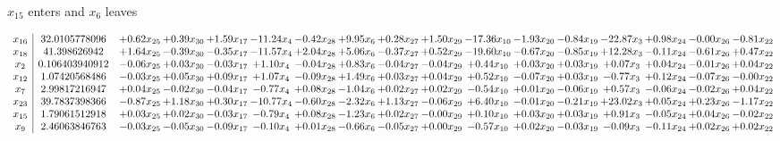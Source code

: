 \documentclass[9pt]{article}
\begin{document}
 $ x_{15} $ enters and $ x_{6} $ leaves 

 \[\begin{array}{c| c c@{\hskip 2pt} c@{\hskip 2pt} c@{\hskip 2pt} c@{\hskip 2pt} c@{\hskip 2pt} c@{\hskip 2pt} c@{\hskip 2pt} c@{\hskip 2pt} c@{\hskip 2pt} c@{\hskip 2pt} c@{\hskip 2pt} c@{\hskip 2pt} c@{\hskip 2pt} c@{\hskip 2pt} c@{\hskip 2pt} }
 x_{16}   &  32.0105778096 & +  0.62 x_{25} & +  0.39 x_{30} & +  1.59 x_{17} & -11.24 x_{4} & -0.42 x_{28} & +  9.95 x_{6} & +  0.28 x_{27} & +  1.50 x_{29} & -17.36 x_{10} & -1.93 x_{20} & -0.84 x_{19} & -22.87 x_{3} & +  0.98 x_{24} & -0.00 x_{26} & -0.81 x_{22}\\
 x_{18}   &  41.398626942 & +  1.64 x_{25} & -0.39 x_{30} & -0.35 x_{17} & -11.57 x_{4} & +  2.04 x_{28} & +  5.06 x_{6} & -0.37 x_{27} & +  0.52 x_{29} & -19.60 x_{10} & -0.67 x_{20} & -0.85 x_{19} & + 12.28 x_{3} & -0.11 x_{24} & -0.61 x_{26} & +  0.47 x_{22}\\
 x_{2}   &  0.106403940912 & -0.06 x_{25} & +  0.03 x_{30} & -0.03 x_{17} & +  1.10 x_{4} & -0.04 x_{28} & +  0.83 x_{6} & -0.04 x_{27} & -0.04 x_{29} & +  0.44 x_{10} & +  0.03 x_{20} & +  0.03 x_{19} & +  0.07 x_{3} & +  0.04 x_{24} & -0.01 x_{26} & +  0.04 x_{22}\\
 x_{12}   &  1.07420568486 & -0.03 x_{25} & +  0.05 x_{30} & +  0.09 x_{17} & +  1.07 x_{4} & -0.09 x_{28} & +  1.49 x_{6} & +  0.03 x_{27} & +  0.04 x_{29} & +  0.52 x_{10} & -0.07 x_{20} & +  0.03 x_{19} & -0.77 x_{3} & +  0.12 x_{24} & -0.07 x_{26} & -0.00 x_{22}\\
 x_{7}   &  2.99817216947 & +  0.04 x_{25} & -0.02 x_{30} & -0.04 x_{17} & -0.77 x_{4} & +  0.08 x_{28} & -1.04 x_{6} & +  0.02 x_{27} & +  0.02 x_{29} & -0.54 x_{10} & +  0.01 x_{20} & -0.06 x_{19} & +  0.57 x_{3} & -0.06 x_{24} & -0.02 x_{26} & +  0.04 x_{22}\\
 x_{23}   &  39.7837398366 & -0.87 x_{25} & +  1.18 x_{30} & +  0.30 x_{17} & -10.77 x_{4} & -0.60 x_{28} & -2.32 x_{6} & +  1.13 x_{27} & -0.06 x_{29} & +  6.40 x_{10} & -0.01 x_{20} & -0.21 x_{19} & + 23.02 x_{3} & +  0.05 x_{24} & +  0.23 x_{26} & -1.17 x_{22}\\
 x_{15}   &  1.79061512918 & +  0.03 x_{25} & +  0.02 x_{30} & -0.03 x_{17} & -0.79 x_{4} & +  0.08 x_{28} & -1.23 x_{6} & +  0.02 x_{27} & -0.00 x_{29} & +  0.10 x_{10} & +  0.03 x_{20} & +  0.03 x_{19} & +  0.91 x_{3} & -0.05 x_{24} & +  0.04 x_{26} & -0.02 x_{22}\\
 x_{9}   &  2.46063846763 & -0.03 x_{25} & -0.05 x_{30} & -0.09 x_{17} & -0.10 x_{4} & +  0.01 x_{28} & -0.66 x_{6} & -0.05 x_{27} & +  0.00 x_{29} & -0.57 x_{10} & +  0.02 x_{20} & -0.03 x_{19} & -0.09 x_{3} & -0.11 x_{24} & +  0.02 x_{26} & +  0.02 x_{22}\\

\end{array}\]
\end{document}
